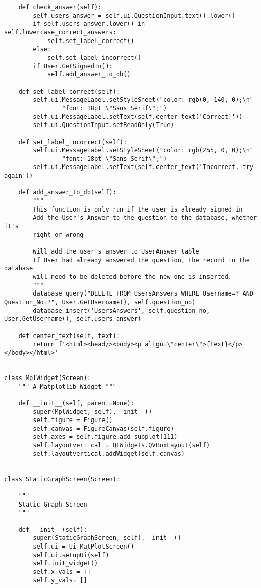 \documentclass{article}
\begin{document}
\begin{lstlisting}
    def check_answer(self):
        self.users_answer = self.ui.QuestionInput.text().lower()
        if self.users_answer.lower() in self.lowercase_correct_answers:
            self.set_label_correct()
        else:
            self.set_label_incorrect()
        if User.GetSignedIn():
            self.add_answer_to_db()

    def set_label_correct(self):
        self.ui.MessageLabel.setStyleSheet("color: rgb(0, 140, 0);\n"
                "font: 18pt \"Sans Serif\";")
        self.ui.MessageLabel.setText(self.center_text('Correct!'))
        self.ui.QuestionInput.setReadOnly(True)

    def set_label_incorrect(self):
        self.ui.MessageLabel.setStyleSheet("color: rgb(255, 0, 0);\n"
                "font: 18pt \"Sans Serif\";")
        self.ui.MessageLabel.setText(self.center_text('Incorrect, try again'))

    def add_answer_to_db(self):
        """
        This function is only run if the user is already signed in
        Add the User's Answer to the question to the database, whether it's
        right or wrong

        Will add the user's answer to UserAnswer table
        If User had already answered the question, the record in the database
        will need to be deleted before the new one is inserted.
        """
        database_query("DELETE FROM UsersAnswers WHERE Username=? AND Question_No=?", User.GetUsername(), self.question_no)
        database_insert('UsersAnswers', self.question_no, User.GetUsername(), self.users_answer)

    def center_text(self, text):
        return f'<html><head/><body><p align=\"center\">{text}</p></body></html>'


class MplWidget(Screen):
    """ A Matplotlib Widget """

    def __init__(self, parent=None):
        super(MplWidget, self).__init__()
        self.figure = Figure()
        self.canvas = FigureCanvas(self.figure)
        self.axes = self.figure.add_subplot(111)
        self.layoutvertical = QtWidgets.QVBoxLayout(self)
        self.layoutvertical.addWidget(self.canvas)


class StaticGraphScreen(Screen):

    """
    Static Graph Screen
    """

    def __init__(self):
        super(StaticGraphScreen, self).__init__()
        self.ui = Ui_MatPlotScreen()
        self.ui.setupUi(self)
        self.init_widget()
        self.x_vals = []
        self.y_vals= []


\end{lstlisting}
\end{document}

